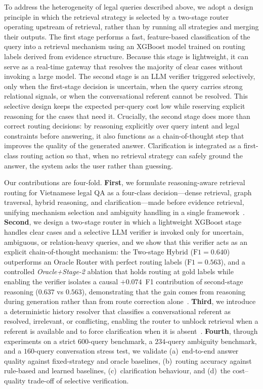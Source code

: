 To address the heterogeneity of legal queries described above, we adopt a
design principle in which the retrieval strategy is selected by a two-stage
router operating upstream of retrieval, rather than by running all strategies
and merging their outputs. The first stage performs a fast, feature-based
classification of the query into a retrieval mechanism using an XGBoost model
trained on routing labels derived from evidence structure. Because this stage
is lightweight, it can serve as a real-time gateway that resolves the
majority of clear cases without invoking a large model. The second stage is
an LLM verifier triggered selectively, only when the first-stage decision is
uncertain, when the query carries strong relational signals, or when the
conversational referent cannot be resolved. This selective design keeps the
expected per-query cost low while reserving explicit reasoning for the cases
that need it. Crucially, the second stage does more than correct routing
decisions: by reasoning explicitly over query intent and legal constraints
before answering, it also functions as a chain-of-thought step that improves
the quality of the generated answer. Clarification is integrated as a
first-class routing action so that, when no retrieval strategy can safely
ground the answer, the system asks the user rather than guessing.

Our contributions are four-fold. \textbf{First}, we formulate
reasoning-aware retrieval routing for Vietnamese legal QA as a four-class
decision---dense retrieval, graph traversal, hybrid reasoning, and
clarification---made before evidence retrieval, unifying mechanism selection
and ambiguity handling in a single
framework~\cite{jeong2024adaptive,min2020ambigqa}. \textbf{Second}, we design
a two-stage router in which a lightweight XGBoost stage handles clear cases
and a selective LLM verifier is invoked only for uncertain, ambiguous, or
relation-heavy queries, and we show that this verifier acts as an explicit
chain-of-thought mechanism: the Two-stage Hybrid ($\text{F1}=0.640$)
outperforms an Oracle Router with perfect routing labels
($\text{F1}=0.563$), and a controlled \textit{Oracle+Stage-2} ablation that
holds routing at gold labels while enabling the verifier isolates a causal
$+0.074$~F1 contribution of second-stage reasoning ($0.637$ vs $0.563$),
demonstrating that the gain comes from reasoning during generation rather
than from route correction alone~\cite{chen2023frugalgpt}. \textbf{Third}, we introduce a deterministic
history resolver that classifies a conversational referent as resolved,
irrelevant, or conflicting, enabling the router to unblock retrieval when a
referent is available and to force clarification when it is
absent~\cite{elgohary2019canard}. \textbf{Fourth}, through experiments on a
strict $600$-query benchmark, a $234$-query ambiguity benchmark, and a
$160$-query conversation stress test, we validate (a)~end-to-end answer
quality against fixed-strategy and oracle baselines, (b)~routing accuracy
against rule-based and learned baselines, (c)~clarification behaviour, and
(d)~the cost--quality trade-off of selective verification.

